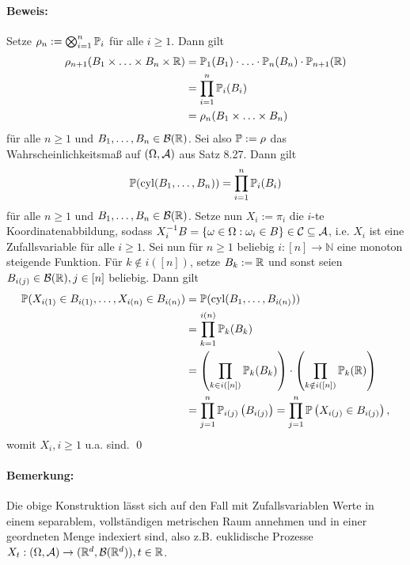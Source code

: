 \paragraph{Beweis:} Setze $\rho_n:=\bigotimes_{i=1}^n\mathbb{P}_i$ f\"ur alle $i\geq1$. Dann gilt 
\begin{align*}
	\rho_{n+1}(B_1\times\hdots\times B_n\times\mathbb{R})&=\mathbb{P}_1(B_1)\cdot\hdots\cdot\mathbb{P}_n(B_n)\cdot\mathbb{P}_{n+1}(\mathbb{R})\\
	&=\prod_{i=1}^n \mathbb{P}_i(B_i)\\
	&=\rho_n(B_1\times\hdots\times B_n)
\end{align*}
f\"ur alle $n\geq1$ und $B_1,\dots,B_n\in\mathcal{B}(\mathbb{R})$. Sei also $\mathbb{P}:=\rho$ das Wahrscheinlichkeitsma\ss{} auf $(\Omega,\mathcal{A})$ aus Satz 8.27. Dann gilt 
$$\mathbb{P}(\operatorname{cyl}(B_1,\hdots,B_n))=\prod_{i=1}^n\mathbb{P}_i(B_i)$$
f\"ur alle $n\geq1$ und $B_1,\dots,B_n\in\mathcal{B}(\mathbb{R})$. Setze nun $X_i:=\pi_i$ die $i$-te Koordinatenabbildung, sodass $X_i^{-1}B=\{\omega\in\Omega:\omega_i\in B\}\in\mathcal{C}\subseteq\mathcal{A}$, i.e. $X_i$ ist eine Zufallsvariable f\"ur alle $i\geq1$. Sei nun f\"ur $n\geq1$ beliebig $i:[n]\to\mathbb{N}$ eine monoton steigende Funktion. F\"ur $k\notin i([n])$, setze $B_k:=\mathbb{R}$ und sonst seien $B_{i(j)}\in\mathcal{B}(\mathbb{R}),j\in[n]$ beliebig. Dann gilt
\begin{align*}
	\mathbb{P}(X_{i(1)}\in B_{i(1)},\hdots, X_{i(n)}\in B_{i(n)})&=\mathbb{P}(\operatorname{cyl}(B_1,\hdots, B_{i(n)}))\\
	&=\prod_{k=1}^{i(n)}\mathbb{P}_k(B_k)\\
	&=\left(\prod_{k\in i([n])}\mathbb{P}_k(B_k)\right)\cdot\left(\prod_{k\notin i([n])}\mathbb{P}_k(\mathbb{R})\right)\\
	&=\prod_{j=1}^n\mathbb{P}_{i(j)}\left(B_{i(j)}\right)=\prod_{j=1}^n \mathbb{P}\left(X_{i(j)}\in B_{i(j)}\right),
\end{align*}
womit $X_i,i\geq1$ u.a. sind. \qed

\paragraph{Bemerkung:}Die obige Konstruktion l\"asst sich auf den Fall mit Zufallsvariablen Werte in einem separablem, vollst\"andigen metrischen Raum annehmen und in einer geordneten Menge indexiert sind, also z.B. euklidische Prozesse $X_t:(\Omega,\mathcal{A})\to(\mathbb{R}^d,\mathcal{B}(\mathbb{R}^d)),t\in\mathbb{R}$. 




